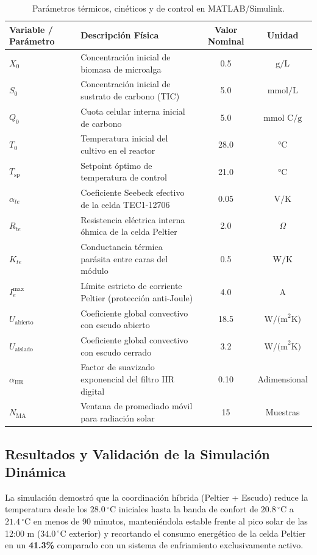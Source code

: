 \begin{table}[htbp]
\centering
\small
\caption{Parámetros térmicos, cinéticos y de control en MATLAB/Simulink.}
\label{tab:parametros_sim}
\begin{tabularx}{\textwidth}{@{}l X c c@{}}
\toprule
\textbf{Variable / Parámetro} & \textbf{Descripción Física} & \textbf{Valor Nominal} & \textbf{Unidad} \\ \midrule
$X_0$ & Concentración inicial de biomasa de microalga & 0.5 & $\text{g/L}$ \\
$S_0$ & Concentración inicial de sustrato de carbono (TIC) & 5.0 & $\text{mmol/L}$ \\
$Q_0$ & Cuota celular interna inicial de carbono & 5.0 & $\text{mmol C/g}$ \\
$T_0$ & Temperatura inicial del cultivo en el reactor & 28.0 & $\text{°C}$ \\
$T_{\text{sp}}$ & Setpoint óptimo de temperatura de control & 21.0 & $\text{°C}$ \\
$\alpha_{te}$ & Coeficiente Seebeck efectivo de la celda TEC1-12706 & 0.05 & $\text{V/K}$ \\
$R_{te}$ & Resistencia eléctrica interna óhmica de la celda Peltier & 2.0 & $\Omega$ \\
$K_{te}$ & Conductancia térmica parásita entre caras del módulo & 0.5 & $\text{W/K}$ \\
$I_e^{\max}$ & Límite estricto de corriente Peltier (protección anti-Joule) & 4.0 & $\text{A}$ \\
$U_{\text{abierto}}$ & Coeficiente global convectivo con escudo abierto & 18.5 & $\text{W/(m}^2\text{K)}$ \\
$U_{\text{aislado}}$ & Coeficiente global convectivo con escudo cerrado & 3.2 & $\text{W/(m}^2\text{K)}$ \\
$\alpha_{\text{IIR}}$ & Factor de suavizado exponencial del filtro IIR digital & 0.10 & Adimensional \\
$N_{\text{MA}}$ & Ventana de promediado móvil para radiación solar & 15 & Muestras \\ \bottomrule
\end{tabularx}
\end{table}

\subsection{Resultados y Validación de la Simulación Dinámica}
La simulación demostró que la coordinación híbrida (Peltier + Escudo) reduce la temperatura desde los $28.0\,^\circ\text{C}$ iniciales hasta la banda de confort de $20.8\,^\circ\text{C}$ a $21.4\,^\circ\text{C}$ en menos de 90 minutos, manteniéndola estable frente al pico solar de las 12:00 m ($34.0\,^\circ\text{C}$ exterior) y recortando el consumo energético de la celda Peltier en un \textbf{41.3\%} comparado con un sistema de enfriamiento exclusivamente activo.
